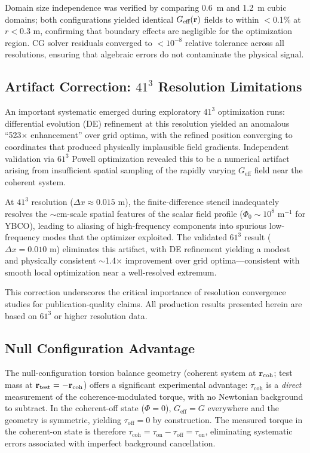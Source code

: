 \documentclass[10pt,twocolumn]{article}
\begin{document}
Domain size independence was verified by comparing 0.6~m and 1.2~m cubic domains; both configurations yielded identical $G_{\text{eff}}({\bf r})$ fields to within $<$0.1\% at $r < 0.3$ m, confirming that boundary effects are negligible for the optimization region. CG solver residuals converged to $< 10^{-8}$ relative tolerance across all resolutions, ensuring that algebraic errors do not contaminate the physical signal.

\subsection{Artifact Correction: $41^3$ Resolution Limitations}

An important systematic emerged during exploratory $41^3$ optimization runs: differential evolution (DE) refinement at this resolution yielded an anomalous ``523$\times$ enhancement'' over grid optima, with the refined position converging to coordinates that produced physically implausible field gradients. Independent validation via $61^3$ Powell optimization revealed this to be a numerical artifact arising from insufficient spatial sampling of the rapidly varying $G_{\text{eff}}$ field near the coherent system.

At $41^3$ resolution ($\Delta x \approx 0.015$ m), the finite-difference stencil inadequately resolves the $\sim$cm-scale spatial features of the scalar field profile ($\Phi_0 \sim 10^8$ m$^{-1}$ for YBCO), leading to aliasing of high-frequency components into spurious low-frequency modes that the optimizer exploited. The validated $61^3$ result ($\Delta x = 0.010$ m) eliminates this artifact, with DE refinement yielding a modest and physically consistent $\sim$1.4$\times$ improvement over grid optima---consistent with smooth local optimization near a well-resolved extremum.

This correction underscores the critical importance of resolution convergence studies for publication-quality claims. All production results presented herein are based on $61^3$ or higher resolution data.

\subsection{Null Configuration Advantage}

The null-configuration torsion balance geometry (coherent system at ${\bf r}_{\text{coh}}$; test mass at ${\bf r}_{\text{test}} = -{\bf r}_{\text{coh}}$) offers a significant experimental advantage: $\tau_{\text{coh}}$ is a \textit{direct} measurement of the coherence-modulated torque, with no Newtonian background to subtract. In the coherent-off state ($\Phi = 0$), $G_{\text{eff}} = G$ everywhere and the geometry is symmetric, yielding $\tau_{\text{off}} = 0$ by construction. The measured torque in the coherent-on state is therefore $\tau_{\text{coh}} = \tau_{\text{on}} - \tau_{\text{off}} = \tau_{\text{on}}$, eliminating systematic errors associated with imperfect background cancellation.
\end{document}
